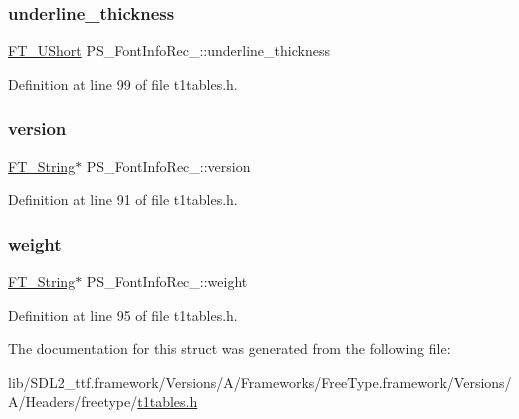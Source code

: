 \mbox{\label{struct_p_s___font_info_rec___a423904e811db5195485557bf0dccf126}} 
\subsubsection{\texorpdfstring{underline\_thickness}{underline\_thickness}}
{\footnotesize\ttfamily \mbox{\hyperlink{fttypes_8h_a937f6c17cf5ffd09086d8610c37b9f58}{F\+T\+\_\+\+U\+Short}} P\+S\+\_\+\+Font\+Info\+Rec\+\_\+\+::underline\+\_\+thickness}



Definition at line 99 of file t1tables.\+h.

\mbox{\label{struct_p_s___font_info_rec___adb595076e50f8e7ece9446f612433cfc}} 
\subsubsection{\texorpdfstring{version}{version}}
{\footnotesize\ttfamily \mbox{\hyperlink{fttypes_8h_a9846214585359eb2ba6bbb0e6de30639}{F\+T\+\_\+\+String}}$\ast$ P\+S\+\_\+\+Font\+Info\+Rec\+\_\+\+::version}



Definition at line 91 of file t1tables.\+h.

\mbox{\label{struct_p_s___font_info_rec___a057243ec7cf62f573fa675ccb728f4b1}} 
\subsubsection{\texorpdfstring{weight}{weight}}
{\footnotesize\ttfamily \mbox{\hyperlink{fttypes_8h_a9846214585359eb2ba6bbb0e6de30639}{F\+T\+\_\+\+String}}$\ast$ P\+S\+\_\+\+Font\+Info\+Rec\+\_\+\+::weight}



Definition at line 95 of file t1tables.\+h.



The documentation for this struct was generated from the following file\+:\begin{DoxyCompactItemize}
\item 
lib/\+S\+D\+L2\+\_\+ttf.\+framework/\+Versions/\+A/\+Frameworks/\+Free\+Type.\+framework/\+Versions/\+A/\+Headers/freetype/\mbox{\hyperlink{t1tables_8h}{t1tables.\+h}}\end{DoxyCompactItemize}
